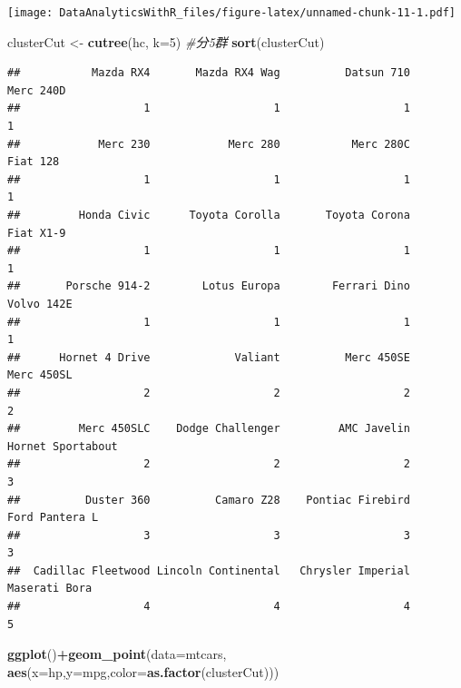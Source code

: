 \documentclass[
]{book}
\newenvironment{Shaded}{\begin{snugshade}}{\end{snugshade}}
\newcommand{\CommentTok}[1]{\textcolor[rgb]{0.56,0.35,0.01}{\textit{#1}}}
\newcommand{\DataTypeTok}[1]{\textcolor[rgb]{0.13,0.29,0.53}{#1}}
\newcommand{\DecValTok}[1]{\textcolor[rgb]{0.00,0.00,0.81}{#1}}
\newcommand{\KeywordTok}[1]{\textcolor[rgb]{0.13,0.29,0.53}{\textbf{#1}}}
\newcommand{\NormalTok}[1]{#1}
\newcommand{\OperatorTok}[1]{\textcolor[rgb]{0.81,0.36,0.00}{\textbf{#1}}}
\newcommand{\StringTok}[1]{\textcolor[rgb]{0.31,0.60,0.02}{#1}}
\begin{document}
\texttt{[image: DataAnalyticsWithR\_files/figure-latex/unnamed-chunk-11-1.pdf]}

\begin{Shaded}
\begin{Highlighting}[]
\NormalTok{clusterCut <-}\StringTok{ }\KeywordTok{cutree}\NormalTok{(hc, }\DataTypeTok{k=}\DecValTok{5}\NormalTok{) }\CommentTok{#分5群}
\KeywordTok{sort}\NormalTok{(clusterCut)}
\end{Highlighting}
\end{Shaded}

\begin{verbatim}
##           Mazda RX4       Mazda RX4 Wag          Datsun 710           Merc 240D 
##                   1                   1                   1                   1 
##            Merc 230            Merc 280           Merc 280C            Fiat 128 
##                   1                   1                   1                   1 
##         Honda Civic      Toyota Corolla       Toyota Corona           Fiat X1-9 
##                   1                   1                   1                   1 
##       Porsche 914-2        Lotus Europa        Ferrari Dino          Volvo 142E 
##                   1                   1                   1                   1 
##      Hornet 4 Drive             Valiant          Merc 450SE          Merc 450SL 
##                   2                   2                   2                   2 
##         Merc 450SLC    Dodge Challenger         AMC Javelin   Hornet Sportabout 
##                   2                   2                   2                   3 
##          Duster 360          Camaro Z28    Pontiac Firebird      Ford Pantera L 
##                   3                   3                   3                   3 
##  Cadillac Fleetwood Lincoln Continental   Chrysler Imperial       Maserati Bora 
##                   4                   4                   4                   5
\end{verbatim}

\begin{Shaded}
\begin{Highlighting}[]
\KeywordTok{ggplot}\NormalTok{()}\OperatorTok{+}\KeywordTok{geom_point}\NormalTok{(}\DataTypeTok{data=}\NormalTok{mtcars,}
                    \KeywordTok{aes}\NormalTok{(}\DataTypeTok{x=}\NormalTok{hp,}\DataTypeTok{y=}\NormalTok{mpg,}\DataTypeTok{color=}\KeywordTok{as.factor}\NormalTok{(clusterCut)))}
\end{Highlighting}
\end{Shaded}
\end{document}
